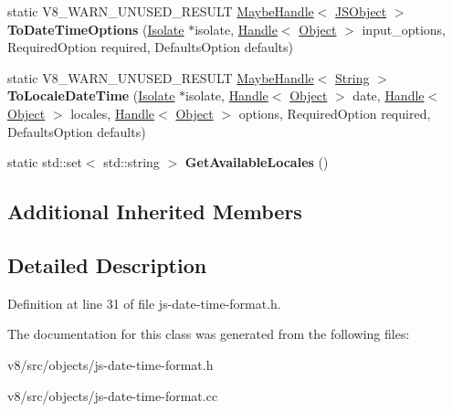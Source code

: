 \begin{DoxyCompactItemize}
static V8\+\_\+\+W\+A\+R\+N\+\_\+\+U\+N\+U\+S\+E\+D\+\_\+\+R\+E\+S\+U\+LT \mbox{\hyperlink{classv8_1_1internal_1_1MaybeHandle}{Maybe\+Handle}}$<$ \mbox{\hyperlink{classv8_1_1internal_1_1JSObject}{J\+S\+Object}} $>$ {\bfseries To\+Date\+Time\+Options} (\mbox{\hyperlink{classv8_1_1internal_1_1Isolate}{Isolate}} $\ast$isolate, \mbox{\hyperlink{classv8_1_1internal_1_1Handle}{Handle}}$<$ \mbox{\hyperlink{classv8_1_1internal_1_1Object}{Object}} $>$ input\+\_\+options, Required\+Option required, Defaults\+Option defaults)
\item 
\mbox{\label{classv8_1_1internal_1_1JSDateTimeFormat_a2b9ee3fb0c1d777bc33a2adcf04ae4a0}} 
static V8\+\_\+\+W\+A\+R\+N\+\_\+\+U\+N\+U\+S\+E\+D\+\_\+\+R\+E\+S\+U\+LT \mbox{\hyperlink{classv8_1_1internal_1_1MaybeHandle}{Maybe\+Handle}}$<$ \mbox{\hyperlink{classv8_1_1internal_1_1String}{String}} $>$ {\bfseries To\+Locale\+Date\+Time} (\mbox{\hyperlink{classv8_1_1internal_1_1Isolate}{Isolate}} $\ast$isolate, \mbox{\hyperlink{classv8_1_1internal_1_1Handle}{Handle}}$<$ \mbox{\hyperlink{classv8_1_1internal_1_1Object}{Object}} $>$ date, \mbox{\hyperlink{classv8_1_1internal_1_1Handle}{Handle}}$<$ \mbox{\hyperlink{classv8_1_1internal_1_1Object}{Object}} $>$ locales, \mbox{\hyperlink{classv8_1_1internal_1_1Handle}{Handle}}$<$ \mbox{\hyperlink{classv8_1_1internal_1_1Object}{Object}} $>$ options, Required\+Option required, Defaults\+Option defaults)
\item 
\mbox{\label{classv8_1_1internal_1_1JSDateTimeFormat_a12a41abac2cf5ced9c363679f35a51d6}} 
static std\+::set$<$ std\+::string $>$ {\bfseries Get\+Available\+Locales} ()
\end{DoxyCompactItemize}
\subsection*{Additional Inherited Members}


\subsection{Detailed Description}


Definition at line 31 of file js-\/date-\/time-\/format.\+h.



The documentation for this class was generated from the following files\+:\begin{DoxyCompactItemize}
\item 
v8/src/objects/js-\/date-\/time-\/format.\+h\item 
v8/src/objects/js-\/date-\/time-\/format.\+cc\end{DoxyCompactItemize}
